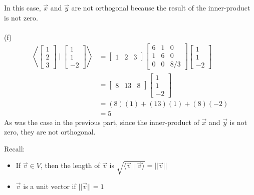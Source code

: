 \documentclass{report}
\begin{document}
In this case,  $\vec{x}$ and $\vec{y}$ are not orthogonal because the result of the inner-product is not zero.\\
\\
\noindent (f)
$$
\begin{aligned}
\left\langle\begin{bmatrix}1\\2\\3\end{bmatrix}\mid\begin{bmatrix}1\\1\\-2\end{bmatrix}\right\rangle&=
\begin{bmatrix}1&2&3\end{bmatrix}\begin{bmatrix}
6 & 1 & 0 \\
1 & 6 & 0 \\
0 & 0 & 8 / 3
\end{bmatrix}\begin{bmatrix}1\\1\\-2\end{bmatrix}\\
&=\begin{bmatrix}8&13&8\end{bmatrix}\begin{bmatrix}1\\1\\-2\end{bmatrix}\\
&=(8)(1)+(13)(1)+(8)(-2)\\
&=5
\end{aligned}
$$
As was the case in the previous part,  since the inner-product of $\vec{x}$ and $\vec{y}$ is not zero,  they are not orthogonal.
\pagebreak
{}
\begin{note}
Recall:
\begin{itemize}
\item If $\vec{v}\in V$,  then the length of $\vec{v}$ is $\sqrt{\langle\vec{v}\mid\vec{v}\rangle} = ||\vec{v}||$
\item $\vec{v}$ is a unit vector if $||\vec{v}||=1$
\end{itemize}
\end{note}
\end{document}
